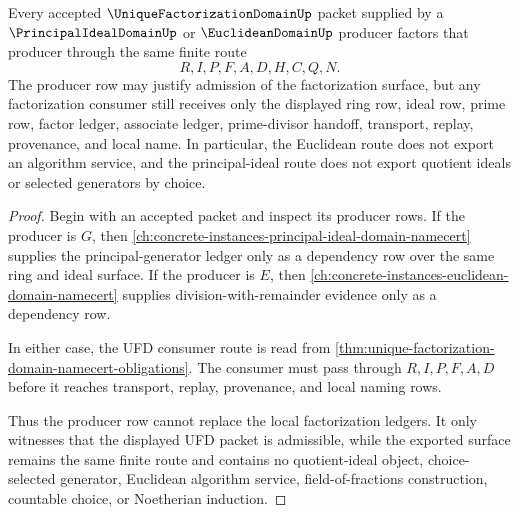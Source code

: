 \begin{theorem}
\label{thm:unique-factorization-domain-pid-euclidean-route}
Every accepted $\UniqueFactorizationDomainUp$ packet supplied by a $\PrincipalIdealDomainUp$ or $\EuclideanDomainUp$ producer factors that producer through the same finite route
$$
R,I,P,F,A,D,H,C,Q,N.
$$
The producer row may justify admission of the factorization surface, but any factorization consumer still receives only the displayed ring row, ideal row, prime row, factor ledger, associate ledger, prime-divisor handoff, transport, replay, provenance, and local name. In particular, the Euclidean route does not export an algorithm service, and the principal-ideal route does not export quotient ideals or selected generators by choice.
\end{theorem}
\begin{proof}
Begin with an accepted packet and inspect its producer rows. If the producer is $G$, then \autoref{ch:concrete-instances-principal-ideal-domain-namecert} supplies the principal-generator ledger only as a dependency row over the same ring and ideal surface. If the producer is $E$, then \autoref{ch:concrete-instances-euclidean-domain-namecert} supplies division-with-remainder evidence only as a dependency row.

In either case, the UFD consumer route is read from \autoref{thm:unique-factorization-domain-namecert-obligations}. The consumer must pass through $R,I,P,F,A,D$ before it reaches transport, replay, provenance, and local naming rows.

Thus the producer row cannot replace the local factorization ledgers. It only witnesses that the displayed UFD packet is admissible, while the exported surface remains the same finite route and contains no quotient-ideal object, choice-selected generator, Euclidean algorithm service, field-of-fractions construction, countable choice, or Noetherian induction.
\end{proof}




